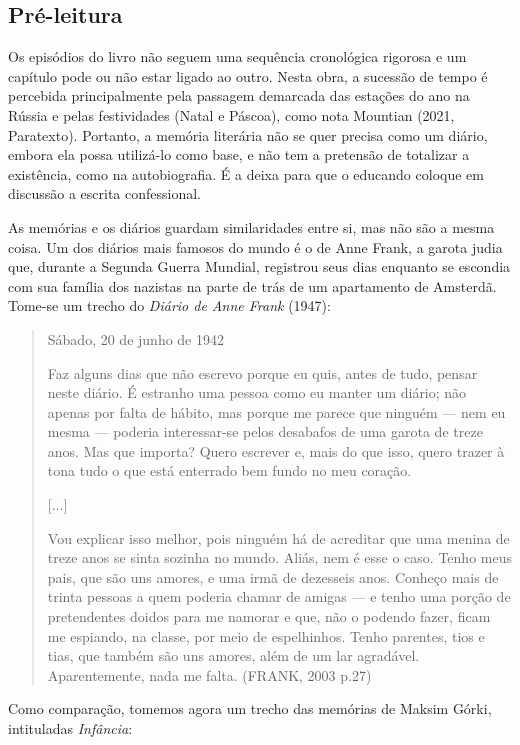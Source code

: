 \documentclass{article}
\begin{document}
\subsection{Pré-leitura}

Os episódios do livro não seguem uma sequência cronológica rigorosa e
um capítulo pode ou não estar ligado ao outro. Nesta obra, a sucessão de
tempo é percebida principalmente pela passagem demarcada das estações do
ano na Rússia e pelas festividades (Natal e Páscoa), como nota Mountian
(2021, Paratexto). Portanto, a memória literária não se quer precisa
como um diário, embora ela possa utilizá-lo como base, e não tem a
pretensão de totalizar a existência, como na autobiografia. É a deixa
para que o educando coloque em discussão a escrita confessional.

As memórias e os diários guardam similaridades entre si, mas não são a
mesma coisa. Um dos diários mais famosos do mundo é o de Anne Frank, a
garota judia que, durante a Segunda Guerra Mundial, registrou seus dias
enquanto se escondia com sua família dos nazistas na parte de trás de um
apartamento de Amsterdã. Tome-se um trecho do \emph{Diário de Anne
Frank} (1947):

\begin{quote}
Sábado, 20 de junho de 1942

Faz alguns dias que não escrevo porque eu quis, antes de tudo, pensar
neste diário. É estranho uma pessoa como eu manter um diário; não apenas
por falta de hábito, mas porque me parece que ninguém --- nem eu mesma
--- poderia interessar-se pelos desabafos de uma garota de treze anos.
Mas que importa? Quero escrever e, mais do que isso, quero trazer à tona
tudo o que está enterrado bem fundo no meu coração.

{[}...{]}

Vou explicar isso melhor, pois ninguém há de acreditar que uma menina de
treze anos se sinta sozinha no mundo. Aliás, nem é esse o caso. Tenho
meus pais, que são uns amores, e uma irmã de dezesseis anos. Conheço
mais de trinta pessoas a quem poderia chamar de amigas --- e tenho uma
porção de pretendentes doidos para me namorar e que, não o podendo
fazer, ficam me espiando, na classe, por meio de espelhinhos. Tenho
parentes, tios e tias, que também são uns amores, além de um lar
agradável. Aparentemente, nada me falta. (FRANK, 2003 p.27)
\end{quote}

Como comparação, tomemos agora um trecho das memórias de Maksim Górki,
intituladas \emph{Infância}:
\end{document}
